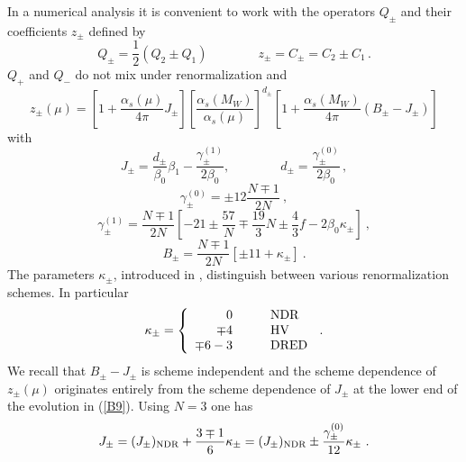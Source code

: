 \documentclass[12pt,rotate]{article}
\def\as{\alpha_s}
\begin{document}
\begin{itemize}
\begin{itemize}
In a numerical analysis it is convenient to work with the operators
 $Q_{\pm}$ and their coefficients $z_{\pm}$ defined by
\begin{equation}\label{B7}
Q_{\pm}=\frac{1}{2} (Q_2\pm Q_1)
\qquad
\qquad
z_\pm=C_\pm=C_2\pm C_1 \, .
\end{equation}
$Q_+$ and $Q_-$ do not mix under renormalization and 
\begin{equation}\label{B9}
z_\pm(\mu)=\left[1+\frac{\as(\mu)}{4\pi}J_\pm\right]
      \left[\frac{\as(M_W)}{\as(\mu)}\right]^{d_\pm}
\left[1+\frac{\as(M_W)}{4\pi}(B_\pm-J_\pm)\right]
\end{equation}
with
\begin{equation}\label{B10}
J_\pm=\frac{d_\pm}{\beta_0}\beta_1-\frac{\gamma^{(1)}_\pm}{2\beta_0},
\qquad\qquad
d_\pm=\frac{\gamma^{(0)}_\pm}{2\beta_0} \, ,
\end{equation}
\begin{equation}\label{B11}
\gamma^{(0)}_\pm=\pm 12 \frac{N\mp 1}{2N}~,
\end{equation}
\begin{equation}\label{B12}
\gamma^{(1)}_{\pm}=\frac{N\mp 1}{2N}
\left[-21\pm\frac{57}{N}\mp\frac{19}{3}N \pm
\frac{4}{3}f-2\beta_0\kappa_\pm\right]~,
\end{equation}
\begin{equation}\label{B13}
B_\pm=\frac{N\mp 1}{2N}\left[\pm 11+\kappa_\pm\right]~.
\end{equation}
The parameters
 $\kappa_\pm$, introduced in \cite{AJB94a}, distinguish between various
renormalization schemes. In particular
\begin{equation}
\kappa_\pm = \left\{ \begin{array}{rl}
    0 & \qquad {\rm NDR}  \\
\mp 4 & \qquad {\rm HV} \\
\mp 6-3 & \qquad {\rm DRED}
\end{array}\right. \, .
\label{B14}
\end{equation}
We recall that
 $B_\pm-J_\pm$ is scheme independent
and the scheme
dependence of  $z_\pm(\mu)$ originates 
entirely from the scheme dependence of $J_\pm$ at the lower end of the
evolution in (\ref{B9}). Using $N=3$ one has
\begin{equation}\label{B15}
J_\pm=(J_\pm)_{\rm NDR}+\frac{3\mp 1}{6}\kappa_\pm
=(J_\pm)_{\rm NDR}\pm\frac{\gamma^{(0)}_\pm}{12}\kappa_\pm~.
\end{equation}


\end{itemize}
\end{itemize}
\end{document}
